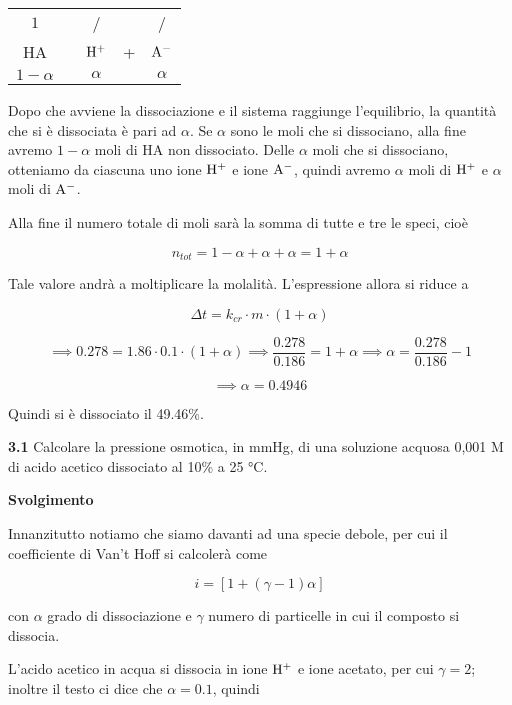 \begin{center}
    \begin{tabular}{ccccc}
        $1$ & & / & & /\\
        HA & \ce{<-->} & $\rm H^+$ & + & $\rm A^-$\\
        $1 - \alpha$ &  &  $\alpha$ & & $\alpha$\\
    \end{tabular}
\end{center}

Dopo che avviene la dissociazione e il sistema raggiunge l'equilibrio, la quantità che si è dissociata è pari ad $\alpha$. Se $\alpha$ sono le moli che si dissociano, alla fine avremo $1-\alpha$ moli di HA non dissociato. Delle $\alpha$ moli che si dissociano, otteniamo da ciascuna uno ione $\rm H^+$ e ione $\rm A^-$, quindi avremo $\alpha$ moli di $\rm H^+$ e $\alpha$ moli di $\rm A^-$.

Alla fine il numero totale di moli sarà la somma di tutte e tre le speci, cioè

$$n_{tot}=1 - \alpha + \alpha + \alpha=1+\alpha$$

Tale valore andrà a moltiplicare la molalità. L'espressione allora si riduce a

$$\Delta t=k_{cr} \cdot m \cdot (1 + \alpha)$$

$$\implies
0.278 = 1.86 \cdot 0.1 \cdot (1+\alpha)
\implies
\frac{0.278}{0.186}= 1 + \alpha
\implies
\alpha=\frac{0.278}{0.186} - 1$$

$$\implies \alpha=0.4946$$

Quindi si è dissociato il 49.46\%.

\vspace{0.2cm}\textbf{3.1} Calcolare la pressione osmotica, in mmHg, di una soluzione acquosa 0,001 M di acido acetico dissociato al 10\% a 25 °C.

\vspace{0.2cm}\large\textbf{Svolgimento}\normalsize

\vspace{0.2cm}Innanzitutto notiamo che siamo davanti ad una specie debole, per cui il coefficiente di Van't Hoff si calcolerà come

$$i=[1 + (\gamma -1)\alpha]$$

con $\alpha$ grado di dissociazione e $\gamma$ numero di particelle in cui il composto si dissocia.

L'acido acetico in acqua si dissocia in ione $\rm H^+$ e ione acetato, per cui $\gamma=2$; inoltre il testo ci dice che $\alpha=0.1$, quindi

